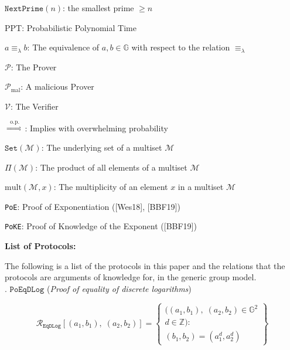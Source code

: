 \documentclass[11pt, lettersize, notitlepage, leqno, footskip=0.6cm]{article}
\newcommand{\ttt}{\texttt}
\newcommand{\sett}{\ttt{Set}}
\newcommand{\impop}{\overset{\;\;\mr{o.p.}\;\;}{\Longrightarrow}}
\newcommand{\eqlam}{\equiv_{\lam}}
\newcommand{\mc}{\mathcal}
\newcommand{\mb}{\mathbb}
\newcommand{\mr}{\mathrm}
\newcommand{\lam}{\lambda}
\newcommand{\noin}{\noindent}
\numberwithin{equation}{section}
\begin{document}
{\noin $\ttt{NextPrime}(n)$: the smallest prime $\geq n$ \vspace{0.1cm}

\noin PPT: Probabilistic Polynomial Time \vspace{0.1cm}

\noindent $a\eqlam b$: The equivalence of $a,b\in\mb{G}$ with respect to the relation $\eqlam$ \vspace{0.1cm}

\noin $\mc{P}$: The Prover \vspace{0.1cm}

\noin $\mc{P}_{\mr{mal}}$: A malicious Prover \vspace{0.1cm}

\noin $\mc{V}$: The Verifier \vspace{0.1cm}

\noin $\impop$: Implies with overwhelming probability \vspace{0.1cm}

\noin $\sett(\mc{M})$: The underlying set of a multiset $\mc{M}$ \vspace{0.1cm}

\noin $\Pi(\mc{M})$: The product of all elements of a multiset $\mc{M}$ \vspace{0.1cm}

\noin $\mr{mult}(\mc{M},x)$: The multiplicity of an element $x$ in a multiset $\mc{M}$ \vspace{0.1cm}

\noin \verb|PoE|: Proof of Exponentiation ([Wes18], [BBF19])

\noin \verb|PoKE|: Proof of Knowledge of the Exponent ([BBF19])

\bigskip \begin{center} \textbf{List of Protocols:}




\end{center}

The following is a list of the protocols in this paper and the relations that the protocols are arguments of knowledge for, in the generic group model.\\

\noin 1. $\ttt{PoEqDLog}$ (\textit{Proof of equality of discrete logarithms}) \vspace{-0.3cm}

\[
  \mc{R}_{{\ttt{EqDLog}}}[(a_1, b_1),\;(a_2,b_2)] = \left\{\begin{array}{l}
    ((a_1, b_1), \; (a_2,b_2)\in\mb{G}^2\\
    d\in\mb{Z}): \\
    (b_1,b_2) = (a_1^d,a_2^d)
  \end{array}\right\}
\]

}
\end{document}

